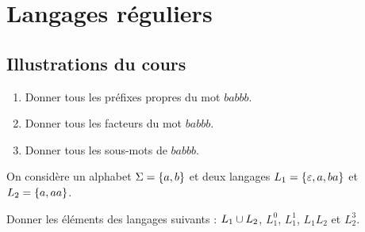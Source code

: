 \chapter{Langages réguliers}

\minitoc

\section*{Illustrations du cours}

\begin{exo}
\begin{enumerate}
    \item Donner tous les préfixes propres du mot \(babbb\). \\
    \item Donner tous les facteurs du mot \(babbb\). \\
    \item Donner tous les sous-mots de \(babbb\).
\end{enumerate}
\end{exo}

\begin{corr}
\end{corr}

\begin{exo}
On considère un alphabet \(\Sigma=\left\lbrace a,b\right\rbrace\) et deux langages \(L_1=\left\lbrace\varepsilon,a,ba\right\rbrace\) et \(L_2=\left\lbrace a,aa\right\rbrace\).

Donner les éléments des langages suivants : \(L_1\cup L_2\), \(L_1^0\), \(L_1^1\), \(L_1L_2\) et \(L_2^3\).
\end{exo}

\begin{corr}
\end{corr}

